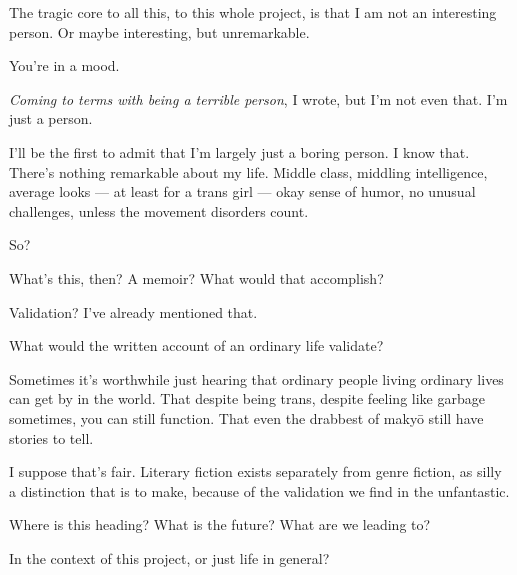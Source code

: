 \label{ally:19}
\begin{paracol}{2}
  \begin{leftcolumn}
\noindent The tragic core to all this, to this whole project, is that I am not an interesting person. Or maybe interesting, but unremarkable.

\begin{ally}
You're in a mood.
\end{ally}
\emph{Coming to terms with being a terrible person}, I wrote, but I'm not even that. I'm just a person.

I'll be the first to admit that I'm largely just a boring person. I know that. There's nothing remarkable about my life. Middle class, middling intelligence, average looks --- at least for a trans girl --- okay sense of humor, no unusual challenges, unless the movement disorders count.

\begin{ally}
So?
\end{ally}
What's this, then? A memoir? What would that accomplish?

\begin{ally}
Validation? I've already mentioned that.
\end{ally}
What would the written account of an ordinary life validate?

\begin{ally}
Sometimes it's worthwhile just hearing that ordinary people living ordinary lives can get by in the world. That despite being trans, despite feeling like garbage sometimes, you can still function. That even the drabbest of makyō still have stories to tell.
\end{ally}
I suppose that's fair. Literary fiction exists separately from genre fiction, as silly a distinction that is to make, because of the validation we find in the unfantastic.

\begin{ally}
Where is this heading? What is the future? What are we leading to?
\end{ally}
In the context of this project, or just life in general?
\end{leftcolumn}
\end{paracol}

